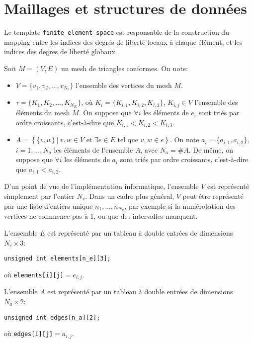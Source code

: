 \section{Maillages et structures de données}

Le template \texttt{finite\_element\_space} est responsable de la
construction du mapping entre les indices des degrés de liberté
locaux à chaque élément, et les indices des degres de liberté
globaux.

Soit $M = (V, E)$ un mesh de triangles conformes. On note:
\begin{itemize}
\item $V = \{v_1, v_2, \dots, v_{N_v}\}$ l'ensemble des vertices du
  mesh $M$.

\item $\tau = \{K_1, K_2, \dots, K_{N_K}\}$, où $K_i = \{K_{i,1},
  K_{i,2}, K_{i,3}\}$, $K_{i,j}\in V$ l'ensemble des éléments du
  mesh $M$. On suppose que $\forall i$ les éléments de $e_i$ sont triés par
  ordre croissants, c'est-à-dire que $K_{i,1} < K_{i,2} < K_{i,3}$.

\item $A = \left\{ \{v, w\}\ |\ v,w\in V \text{ et } \exists e\in E
  \text{ tel que } v,w \in e\right\}$. On note $a_i = \{a_{i,1},
  a_{i,2}\}$, $i = 1, \dots, N_{a}$ les éléments de l'ensemble $A$,
  avec $N_a = \#A$. De même, on suppose que $\forall i$ les éléments de
  $a_i$ sont triés par ordre croissants, c'est-à-dire
  que $a_{i,1} < a_{i,2}$.
\end{itemize}

D'un point de vue de l'implémentation informatique, l'ensemble $V$
est représenté simplement par l'entier $N_v$. Dans un cadre plus
général, $V$ peut être représenté par une liste d'entiers
unique ${n_1, \dots, n_{N_v}}$, par exemple si la numérotation des
vertices ne commence pas à 1, ou que des intervalles manquent.

L'ensemble $E$ est représenté par un tableau à double entrées
de dimensions $N_e \times 3$:
\begin{addmargin}[0.5in]{0em}
  \texttt{unsigned int elements[n\_e][3];}
\end{addmargin}
où \texttt{elements[i][j]}$ = e_{i,j}$.

L'ensemble $A$ est représenté par un tableau à double entrées
de dimensions $N_a \times 2$:
\begin{addmargin}[0.5in]{0em}
  \texttt{unsigned int edges[n\_a][2];}
\end{addmargin}
où \texttt{edges[i][j]}$ = a_{i,j}$.



